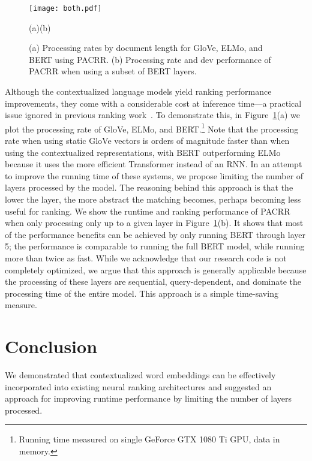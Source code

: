 \documentclass[sigconf]{acmart}
\begin{document}
\begin{figure}
\texttt{[image: both.pdf]}

\vspace{-0.4em}
\small(a)\hspace{12em}(b)
\vspace{-0.9em}

\caption{(a) Processing rates by document length for GloVe, ELMo, and BERT using PACRR. (b) Processing rate and dev performance of PACRR when using a subset of BERT layers.}
\label{fig:runtimes}
\vspace{-1.8em}
\end{figure}

Although the contextualized language models yield ranking performance improvements, they come with a considerable cost at inference time---a practical issue ignored in previous ranking work~\cite{Yang2017AnseriniET,Nogueira2019PassageRW}. To demonstrate this, in Figure~\ref{fig:runtimes}(a) we plot the processing rate of GloVe, ELMo, and BERT.\footnote{Running time measured on single GeForce GTX 1080 Ti GPU, data in memory.} Note that the processing rate when using static GloVe vectors is orders of magnitude faster than when using the contextualized representations, with BERT outperforming ELMo because it uses the more efficient Transformer instead of an RNN. In an attempt to improve the running time of these systems, we propose limiting the number of layers processed by the model. The reasoning behind this approach is that the lower the layer, the more abstract the matching becomes, perhaps becoming less useful for ranking. We show the runtime and ranking performance of PACRR when only processing only up to a given layer in Figure~\ref{fig:runtimes}(b). It shows that most of the performance benefits can be achieved by only running BERT through layer 5; the performance is comparable to running the full BERT model, while running more than twice as fast. While we acknowledge that our research code is not completely optimized, we argue that this approach is generally applicable because the processing of these layers are sequential, query-dependent, and dominate the processing time of the entire model. This approach is a simple time-saving measure.
 \section{Conclusion}

We demonstrated that contextualized word embeddings can be effectively incorporated into existing neural ranking architectures and suggested an approach for improving runtime performance by limiting the number of layers processed.
 


\end{document}
